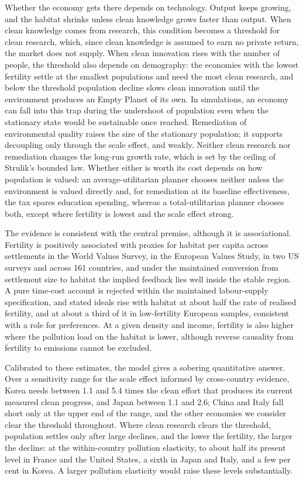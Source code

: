 \documentclass[11pt]{article}
\begin{document}
Whether the economy gets there depends on technology. Output keeps growing, and the habitat shrinks
unless clean knowledge grows faster than output. When clean knowledge comes from research, this
condition becomes a threshold for clean research, which, since clean knowledge is assumed to earn no
private return, the market does not supply. When clean innovation rises with the number of people, the
threshold also depends on demography: the economies with the lowest fertility settle at the smallest
populations and need the most clean research, and below the threshold population decline slows clean
innovation until the environment produces an Empty Planet of its own. In simulations, an economy can
fall into this trap during the undershoot of population even when the stationary state would be
sustainable once reached. Remediation of environmental quality raises the size of the stationary
population; it supports decoupling only through the scale effect, and weakly. Neither clean research
nor remediation changes the long-run growth rate, which is set by the ceiling of Strulik's bounded law.
Whether either is worth its cost depends on how population is valued: an average-utilitarian planner
chooses neither unless the environment is valued directly and, for remediation at its baseline
effectiveness, the tax spares education spending, whereas a total-utilitarian planner chooses
both, except where fertility is lowest and the scale effect strong.

The evidence is consistent with the central premise, although it is associational. Fertility is
positively associated with proxies for habitat per capita across settlements in the World Values Survey,
in the European Values Study, in two US surveys and across 161 countries, and under the maintained
conversion from settlement size to habitat the implied feedback lies well inside the stable region. A
pure time-cost account is rejected within the maintained labour-supply specification, and stated ideals
rise with habitat at about half the rate of realised fertility, and at about a third of it in
low-fertility European samples, consistent with a role for preferences.
At a given density and income, fertility is also higher where the pollution load on the habitat is
lower, although reverse causality from fertility to emissions cannot be excluded.

Calibrated to these estimates, the model gives a sobering quantitative answer. Over a sensitivity range
for the scale effect informed by cross-country evidence, Korea needs between 1.1 and 5.4 times the
clean effort that produces its current measured clean progress, and Japan between 1.1 and 2.6; China and
Italy fall short only at the upper end of the range, and the other economies we consider clear the
threshold throughout. Where clean research clears the threshold, population settles only after large
declines, and the lower the fertility, the larger the decline: at the within-country pollution
elasticity, to about half its present level in France and the United States, a sixth in Japan and
Italy, and a few per cent in Korea. A larger pollution elasticity would raise these levels substantially.
\end{document}
